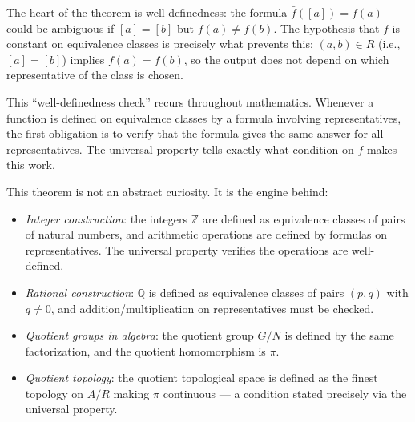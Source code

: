 \begin{remark*}
The heart of the theorem is well-definedness: the formula $\bar{f}([a]) =
f(a)$ could be ambiguous if $[a] = [b]$ but $f(a) \neq f(b)$. The hypothesis
that $f$ is constant on equivalence classes is precisely what prevents this:
$(a,b) \in R$ (i.e., $[a] = [b]$) implies $f(a) = f(b)$, so the output
does not depend on which representative of the class is chosen.

This ``well-definedness check'' recurs throughout mathematics. Whenever a
function is defined on equivalence classes by a formula involving
representatives, the first obligation is to verify that the formula gives
the same answer for all representatives. The universal property tells exactly
what condition on $f$ makes this work.
\end{remark*}

\begin{remark*}
This theorem is not an abstract curiosity. It is the engine behind:
\begin{itemize}
\item \emph{Integer construction}: the integers $\mathbb{Z}$ are defined as
equivalence classes of pairs of natural numbers, and arithmetic operations
are defined by formulas on representatives. The universal property verifies
the operations are well-defined.
\item \emph{Rational construction}: $\mathbb{Q}$ is defined as equivalence
classes of pairs $(p,q)$ with $q \neq 0$, and addition/multiplication on
representatives must be checked.
\item \emph{Quotient groups in algebra}: the quotient group $G/N$ is defined
by the same factorization, and the quotient homomorphism is $\pi$.
\item \emph{Quotient topology}: the quotient topological space is defined as
the finest topology on $A/R$ making $\pi$ continuous — a condition stated
precisely via the universal property.
\end{itemize}
\end{remark*}
